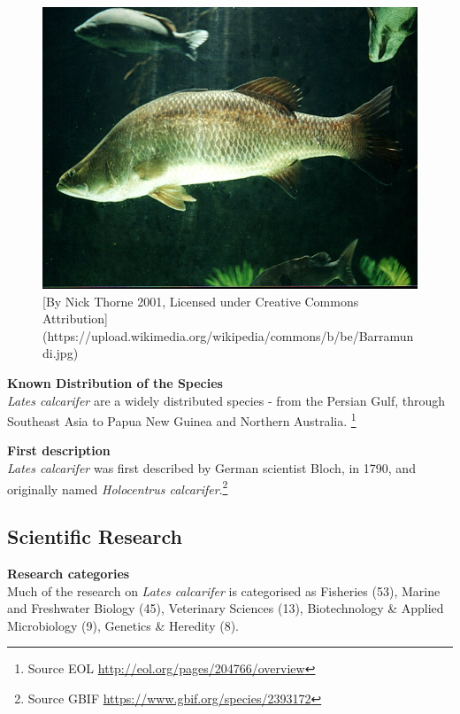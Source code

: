 \documentclass[]{book}
\let\rmarkdownfootnote\footnote%
\def\footnote{\protect\rmarkdownfootnote}
\theoremstyle{definition}
\theoremstyle{definition}
\theoremstyle{definition}
\theoremstyle{remark}
\begin{document}
\begin{figure}

{\centering \includegraphics[width=11.11in]{images_species/Barramundi} 

}

\caption{[By Nick Thorne 2001, Licensed under Creative Commons Attribution](https://upload.wikimedia.org/wikipedia/commons/b/be/Barramundi.jpg)}\label{fig:unnamed-chunk-3}
\end{figure}

\textbf{Known Distribution of the Species}\\
\emph{Lates calcarifer} are a widely distributed species - from the
Persian Gulf, through Southeast Asia to Papua New Guinea and Northern
Australia. \footnote{Source EOL
  \url{http://eol.org/pages/204766/overview}}

\textbf{First description}\\
\emph{Lates calcarifer} was first described by German scientist Bloch,
in 1790, and originally named \emph{Holocentrus calcarifer}.\footnote{Source
  GBIF \url{https://www.gbif.org/species/2393172}}

\hypertarget{scientific-research-1}{%
\subsection{Scientific Research}\label{scientific-research-1}}

\textbf{Research categories}\\
Much of the research on \emph{Lates calcarifer} is categorised as
Fisheries (53), Marine and Freshwater Biology (45), Veterinary Sciences
(13), Biotechnology \& Applied Microbiology (9), Genetics \& Heredity
(8).
\end{document}
